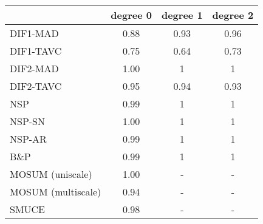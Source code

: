 \begin{tabular}{|l|c|c|c|}
  \hline
 & degree 0 & degree 1 & degree 2 \\ 
  \hline
DIF1-MAD & 0.88 & 0.93 & 0.96 \\ 
  DIF1-TAVC & 0.75 & 0.64 & 0.73 \\ 
  DIF2-MAD & 1.00 & 1 & 1 \\ 
  DIF2-TAVC & 0.95 & 0.94 & 0.93 \\ 
  NSP & 0.99 & 1 & 1 \\ 
  NSP-SN & 1.00 & 1 & 1 \\ 
  NSP-AR & 0.99 & 1 & 1 \\ 
  B\&P & 0.99 & 1 & 1 \\ 
  MOSUM (uniscale) & 1.00 & - & - \\ 
  MOSUM (multiscale) & 0.94 & - & - \\ 
  SMUCE & 0.98 & - & - \\ 
   \hline
\end{tabular}
